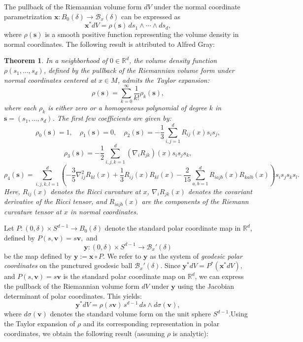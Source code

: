 \documentclass{amsart}
\theoremstyle{Theorem}
\newtheorem{thm}[theorem]{Theorem}
\theoremstyle{remark}
\numberwithin{equation}{section} \numberwithin{figure}{section}
\renewcommand*{\to}{\rightarrow}
\begin{document}
The pullback of the Riemannian volume form \( dV \) under the normal coordinate parametrization
\(
\mathbf{x} : B_0(\delta) \to \mathcal{B}_x(\delta)
\)
can be expressed as
\[
\mathbf{x}^* dV = \rho(\mathbf{s}) \, ds_1 \wedge \cdots \wedge ds_d,
\]
where \( \rho(\mathbf{s}) \) is a smooth positive function representing the volume density in normal coordinates. The following result is attributed to Alfred Gray:

\begin{thm}\label{g1}
In a neighborhood of \( 0 \in \mathbb{R}^d \), the volume density function \(\rho(s_1, \dots, s_d) \), defined by the pullback of the Riemannian volume form under normal coordinates centered at \( x \in M \), admits the Taylor expansion:
\[
\rho(\mathbf{s}) = \sum_{k=0}^{\infty} \frac{1}{k!} \rho_k(\mathbf{s}),
\]
where each \( \rho_k \) is either zero or a homogeneous polynomial of degree \( k \) in \( \mathbf{s} = (s_1, \dots, s_d) \). The first few coefficients are given by:
\[
\rho_0(\mathbf{s}) = 1, \quad 
\rho_1(\mathbf{s}) = 0, \quad 
\rho_2(\mathbf{s}) = - \frac{1}{3}\sum_{i,j=1}^{d} R_{ij}(x) s_i s_j,
\]
\[
\rho_3(\mathbf{s}) = -\frac{1}{2} \sum_{i,j,k=1}^{d} (\nabla_i R_{jk})(x) s_i s_j s_k,
\]
\[
\rho_4(\mathbf{s}) = \sum_{i,j,k,l=1}^{d} \left(
    -\frac{3}{5} \nabla^2_{ij} R_{kl}(x) 
    + \frac{1}{3} R_{ij}(x) R_{kl}(x) 
    - \frac{2}{15} \sum_{a,b=1}^{d} R_{iajb}(x) R_{kalb}(x)
\right) s_i s_j s_k s_l.
\]
Here, \( R_{ij}(x) \) denotes the Ricci curvature at \( x \), \( \nabla_i R_{jk}(x) \) denotes the covariant derivative of the Ricci tensor, and \( R_{iajb}(x) \) are the components of the Riemann curvature tensor at \( x \) in normal coordinates.
\end{thm}

Let \( P : (0, \delta) \times S^{d-1} \to B_0(\delta) \) denote the standard polar coordinate map in \( \mathbb{R}^d \), defined by
\(
P(s, \mathbf{v}) = s \mathbf{v},
\)
and
\[
\mathbf{y} : (0, \delta) \times S^{d-1} \to \mathcal{B}_x'(\delta)
\]
be the map defined by
\(
\mathbf{y} := \mathbf{x} \circ P.
\)
We refer to \( \mathbf{y} \) as the system of \emph{geodesic polar coordinates} on the punctured geodesic ball
\(
\mathcal{B}_x'(\delta).
\)  
Since
\(
\mathbf{y}^* dV = P^* (\mathbf{x}^* dV),
\)
and \( P(s, \mathbf{v}) = s \mathbf{v} \) is the standard polar coordinate map on \( \mathbb{R}^d \), we can express the pullback of the Riemannian volume form \( dV \) under \( \mathbf{y} \) using the Jacobian determinant of polar coordinates. This yields:
\[
\mathbf{y}^* dV = \rho(s \mathbf{v}) \, s^{d-1} \, ds \wedge d\sigma(\mathbf{v}),
\]
where \( d\sigma(\mathbf{v}) \) denotes the standard volume form on the unit sphere \( S^{d-1} \).Using the Taylor expansion of \( \rho \) and its corresponding representation in polar coordinates, we obtain the following result (assuming \( \rho \) is analytic):
\end{document}

